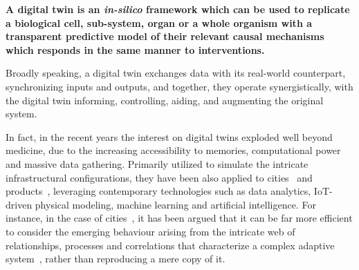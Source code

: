 \documentclass[12pt]{article}
\renewcommand{\(}{\left(}
\renewcommand{\)}{\right)}
\renewcommand{\[}{\left[}
\renewcommand{\]}{\right]}
\newcommand{\heading}[1]{{\vspace{0.25truecm}\noindent\textbf{#1.}}}
\begin{document}
\begin{tcolorbox}[colback=gray80, colframe=black, boxrule=0.5pt]
    \textbf{A digital twin is an \emph{in-silico} framework which can be used to replicate a biological cell, sub-system, organ or a whole organism with a transparent predictive model of their relevant causal mechanisms which responds in the same manner to interventions.}
\end{tcolorbox}


 
Broadly speaking, a digital twin exchanges data with its real-world counterpart, synchronizing inputs and outputs, and together, they operate synergistically, with the digital twin informing, controlling, aiding, and augmenting the original system.

In fact, in the recent years the interest on digital twins exploded well beyond medicine, due to the increasing accessibility to memories, computational power and massive data gathering. Primarily utilized to simulate the intricate infrastructural configurations, they have been also applied to cities~\cite{batty2018inventing} and products~\cite{grieves2005product},  leveraging contemporary technologies such as data analytics, IoT-driven physical modeling\cite{niederer2021scaling}, machine learning and artificial intelligence. For instance, in the case of cities~\cite{caldarelli2023role}, it has been argued that it can be far more efficient to consider the emerging behaviour arising from the intricate web of relationships, processes and correlations that characterize a complex adaptive system~\cite{gell1994complex,holland2002complex,holland2006studying}, rather than reproducing a mere copy of it. 
\end{document}
